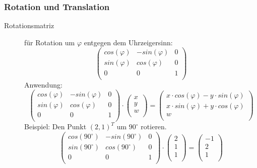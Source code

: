 \documentclass{article}
\begin{document}
\subsubsection{Rotation und Translation}
\begin{description}
 \item[Rotationsmatriz]
  für Rotation um $\varphi$ entgegen dem Uhrzeigersinn:
  \begin{equation}
   \left(\begin{array}{ccc}
    cos(\varphi) & -sin(\varphi) & 0 \\
    sin(\varphi) & cos(\varphi) & 0 \\
    0 & 0 & 1 \\
   \end{array}\right)
  \end{equation}
  Anwendung:
  \begin{equation}
   \left(\begin{array}{ccc}
    cos(\varphi) & -sin(\varphi) & 0 \\
    sin(\varphi) & cos(\varphi) & 0 \\
    0 & 0 & 1 \\
   \end{array}\right)
   \cdot
   \left(\begin{array}{ccc}
    x \\
    y \\
    w \\
   \end{array}\right)
   =
   \left(\begin{array}{ccc}
    x \cdot cos(\varphi) - y \cdot sin(\varphi) \\
    x \cdot sin(\varphi) + y \cdot cos(\varphi) \\
    w \\
   \end{array}\right)
  \end{equation}
  Beispiel: Den Punkt $(2, 1)^{T}$ um $90^{\circ}$ rotieren.
  \begin{equation}
   \left(\begin{array}{ccc}
    cos(90^{\circ}) & -sin(90^{\circ}) & 0 \\
    sin(90^{\circ}) & cos(90^{\circ}) & 0 \\
    0 & 0 & 1 \\
   \end{array}\right)
   \cdot
   \left(\begin{array}{ccc}
    2 \\
    1 \\
    1 \\
   \end{array}\right)
   =
   \left(\begin{array}{ccc}
    -1 \\
    2 \\
    1 \\
   \end{array}\right)
  \end{equation}


\end{description}
\end{document}
